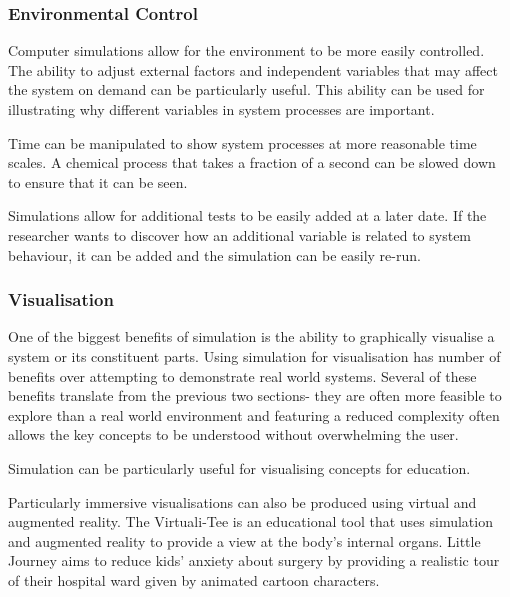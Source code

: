 \documentclass{UoYCSproject}
\begin{document}
\subsubsection{Environmental Control}
Computer simulations allow for the environment to be more easily controlled. The ability to adjust external factors and independent variables that may affect the system on demand can be particularly useful. This ability can be used for illustrating why different variables in system processes are important.

Time can be manipulated to show system processes at more reasonable time scales. A chemical process that takes a fraction of a second can be slowed down to ensure that it can be seen. 


Simulations allow for additional tests to be easily added at a later date. If the researcher wants to discover how an additional variable is related to system behaviour, it can be added and the simulation can be easily re-run.%


\subsubsection{Visualisation}
One of the biggest benefits of simulation is the ability to graphically visualise a system or its constituent parts. Using simulation for visualisation has number of benefits over attempting to demonstrate real world systems. Several of these benefits translate from the previous two sections- they are often more feasible to explore than a real world environment and featuring a reduced complexity often allows the key concepts to be understood without overwhelming the user.

Simulation can be particularly useful for visualising concepts for education. 

Particularly immersive visualisations can also be produced using virtual and augmented reality. The Virtuali-Tee is an educational tool that uses simulation and augmented reality to provide a view at the body's internal organs\cite{curiscope}. Little Journey aims to reduce kids' anxiety about surgery by providing a realistic tour of their hospital ward given by animated cartoon characters\cite{little_journey}.
\end{document}
